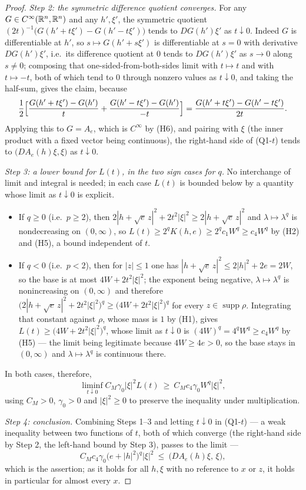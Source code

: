\begin{proof}
\emph{Step 2: the symmetric difference quotient converges.}  For any
$G\in C^\infty(\mathbb{R}^n,\mathbb{R}^n)$ and any $h',\xi'$, the symmetric quotient
$(2t)^{-1}\bigl(G(h'+t\xi')-G(h'-t\xi')\bigr)$ tends to $DG(h')\xi'$ as
$t\downarrow0$.  Indeed $G$ is differentiable at $h'$, so
$s\mapsto G(h'+s\xi')$ is differentiable at $s=0$ with derivative
$DG(h')\xi'$, i.e.\ its difference quotient at $0$ tends to $DG(h')\xi'$ as
$s\to0$ along $s\ne0$; composing that one-sided-from-both-sides limit with
$t\mapsto t$ and with $t\mapsto-t$, both of which tend to $0$ through nonzero
values as $t\downarrow0$, and taking the half-sum, gives the claim, because
\[
\frac12\Bigl[\frac{G(h'+t\xi')-G(h')}{t}
 +\frac{G(h'-t\xi')-G(h')}{-t}\Bigr]
=\frac{G(h'+t\xi')-G(h'-t\xi')}{2t}.
\]
Applying this to $G=A_e$, which is $C^\infty$ by (H6), and pairing with $\xi$
(the inner product with a fixed vector being continuous), the right-hand side of
(Q1-$t$) tends to $\bigl(DA_e(h)\xi,\xi\bigr)$ as $t\downarrow0$.

\emph{Step 3: a lower bound for $L(t)$, in the two sign cases for $q$.}  No
interchange of limit and integral is needed; in each case $L(t)$ is bounded
below by a quantity whose limit as $t\downarrow0$ is explicit.
\begin{itemize}
\item If $q\ge0$ (i.e.\ $p\ge2$), then
  $2|h+\sqrt e\,z|^2+2t^2|\xi|^2\ge2|h+\sqrt e\,z|^2$ and
  $\lambda\mapsto\lambda^{q}$ is nondecreasing on $(0,\infty)$, so
  $L(t)\ge2^{q}K(h,e)\ge2^{q}c_1W^{q}\ge c_4W^{q}$ by (H2) and (H5), a bound
  independent of $t$.
\item If $q<0$ (i.e.\ $p<2$), then for $|z|\le1$ one has
  $|h+\sqrt e\,z|^2\le2|h|^2+2e=2W$, so the base is at most
  $4W+2t^2|\xi|^2$; the exponent being negative,
  $\lambda\mapsto\lambda^{q}$ is nonincreasing on $(0,\infty)$ and therefore
  $\bigl(2|h+\sqrt e\,z|^2+2t^2|\xi|^2\bigr)^{q}\ge\bigl(4W+2t^2|\xi|^2\bigr)^{q}$
  for every $z\in\operatorname{supp}\rho$.  Integrating that constant against
  $\rho$, whose mass is $1$ by (H1), gives
  $L(t)\ge\bigl(4W+2t^2|\xi|^2\bigr)^{q}$, whose limit as $t\downarrow0$ is
  $(4W)^{q}=4^{q}W^{q}\ge c_4W^{q}$ by (H5) --- the limit being legitimate
  because $4W\ge4e>0$, so the base stays in $(0,\infty)$ and
  $\lambda\mapsto\lambda^{q}$ is continuous there.
\end{itemize}
In both cases, therefore,
\[
\liminf_{t\downarrow0}C_M\gamma_0|\xi|^2L(t)\ \ge\ C_Mc_4\gamma_0W^{q}|\xi|^2 ,
\]
using $C_M>0$, $\gamma_0>0$ and $|\xi|^2\ge0$ to preserve the inequality under
multiplication.

\emph{Step 4: conclusion.}  Combining Steps 1--3 and letting $t\downarrow0$ in
(Q1-$t$) --- a weak inequality between two functions of $t$, both of which
converge (the right-hand side by Step 2, the left-hand bound by Step 3), passes
to the limit ---
\[
C_Mc_4\gamma_0\bigl(e+|h|^2\bigr)^{q}|\xi|^2
\ \le\ \bigl(DA_e(h)\xi,\,\xi\bigr),
\]
which is the assertion; as it holds for all $h,\xi$ with no reference to $x$ or
$z$, it holds in particular for almost every $x$.
\end{proof}
